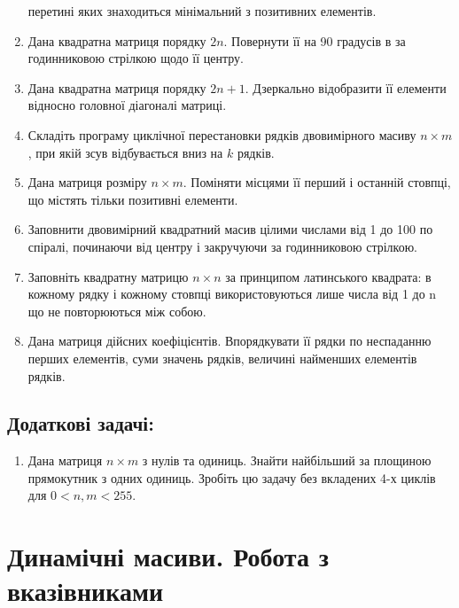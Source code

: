 \documentclass[a5paper,titlepage,openany,twoside,
]
{book_unv}%
\begin{document}
\begin{enumerate}
  перетині яких знаходиться мінімальний з позитивних елементів.
\item
  Дана квадратна матриця порядку $2n$. Повернути її на 90 градусів в
  за годинниковою стрілкою щодо її центру.
\item
  Дана квадратна матриця порядку $2n + 1$. Дзеркально відобразити її
  елементи відносно головної діагоналі матриці.
\item
  Складіть програму циклічної перестановки рядків двовимірного масиву $n \times m$,
  при якій зсув відбувається вниз на $k$ рядків.
\item
  Дана матриця розміру $n \times m$. Поміняти місцями її перший і останній
  стовпці, що містять тільки позитивні елементи.
\item
  Заповнити двовимірний квадратний масив цілими числами від 1 до 100 по
  спіралі, починаючи від центру і закручуючи за годинниковою стрілкою.
\item
  Заповніть квадратну матрицю $n \times n$ за принципом латинського квадрата: в
  кожному рядку і кожному стовпці використовуються лише числа від 1 до n
  що не повторюються між собою.
\item
  Дана матриця дійсних коефіцієнтів. Впорядкувати її рядки по неспаданню
  перших елементів, суми значень рядків, величині найменших елементів
  рядків.
\end{enumerate}

\section{Додаткові задачі:}

\begin{enumerate}
\def\labelenumi{\arabic{enumi})}
\setcounter{enumi}{32}
\item
  Дана матриця $n \times m$ з нулів та одиниць. Знайти найбільший за площиною
  прямокутник з одних одиниць. Зробіть цю задачу без вкладених 4-х
  циклів для $0<n,m<255$.
\end{enumerate}



\chapter{Динамічні масиви. Робота з вказівниками }
%
\end{document}
